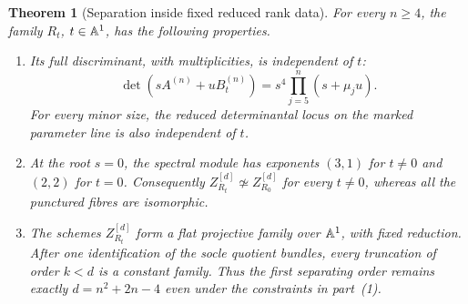 \documentclass[11pt,reqno]{amsart}
\numberwithin{equation}{section}
\newtheorem{theorem}{Theorem}[section]
\theoremstyle{definition}\newtheorem{definition}[theorem]{Definition}
\theoremstyle{remark}\newtheorem{remark}[theorem]{Remark}
\begin{document}
\begin{theorem}[Separation inside fixed reduced rank data]
\label{thm:rank-preserving-specialization}
For every \(n\ge4\), the family \(R_t\), \(t\in\mathbb A^1\),
has the following properties.
\begin{enumerate}
\item Its full discriminant, with multiplicities, is independent of \(t\):
\begin{equation}\label{eq:fixed-discriminant-specialization}
 \det(sA^{(n)}+uB_t^{(n)})
       =s^4\prod_{j=5}^n(s+\mu_j u).
\end{equation}
For every minor size, the reduced determinantal locus on the marked
parameter line is also independent of \(t\).
\item At the root \(s=0\), the spectral module has exponents
\((3,1)\) for \(t\ne0\) and \((2,2)\) for \(t=0\).
Consequently \(Z_{R_t}^{[d]}\not\simeq Z_{R_0}^{[d]}\)
for every \(t\ne0\), whereas all the punctured fibres are isomorphic.
\item The schemes \(Z_{R_t}^{[d]}\) form a flat projective family
over \(\mathbb A^1\), with fixed reduction.  After one identification
of the socle quotient bundles, every truncation of order \(k<d\)
is a constant family.  Thus the first separating order remains
exactly \(d=n^2+2n-4\) even under the constraints in part~(1).
\end{enumerate}
\end{theorem}
\end{document}

